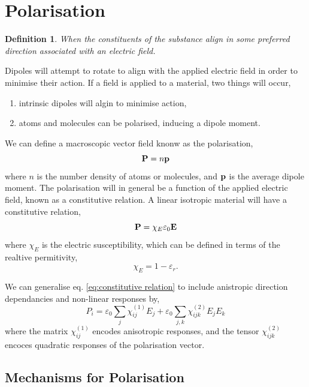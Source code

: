 \documentclass{book}
\newenvironment{aside}
{\begin{mdframed}[style=0,%
		leftline=false,rightline=false,leftmargin=2em,rightmargin=2em,%
		innerleftmargin=0pt,innerrightmargin=0pt,linewidth=0.75pt,%
		skipabove=7pt,skipbelow=7pt]\small}
	{\end{mdframed}}
\newtheorem*{definition}{Definition}
\begin{document}
\section{Polarisation}
\begin{definition}
	When the constituents of the substance align in some preferred direction associated with an electric field.
\end{definition}
Dipoles will attempt to rotate to align with the applied electric field in order to minimise their action. If a field is applied to a material, two things will occur,
\begin{enumerate}
	\item intrinsic dipoles will algin to minimise action,
	\item atoms and molecules can be polarised, inducing a dipole moment.
\end{enumerate}
We can define a macroscopic vector field knonw as the polarisation,
\begin{equation}
	\vb{P} = n\vb{p}
\end{equation}
where $n$ is the number density of atoms or molecules, and $\vb{p}$ is the average dipole moment. The polarisation will in general be a function of the applied electric field, known as a constitutive relation. A linear isotropic material will have a constitutive relation,
\begin{equation}
	\vb{P} = \chi_E\varepsilon_0\vb{E} \label{eq:constitutive relation}
\end{equation}
where $\chi_E$ is the electric susceptibility, which can be defined in terms of the realtive permitivity,
\begin{equation}
	\chi_E = 1 - \varepsilon_r.
\end{equation}
\begin{aside}
	We can generalise eq. \eqref{eq:constitutive relation} to include anistropic direction dependancies and non-linear responses by,
	\begin{equation}
		P_i = \varepsilon_0 \sum_j \chi_{ij}^{(1)}E_j + \varepsilon_0 \sum_{j,k} \chi_{ijk}^{(2)}E_jE_k
	\end{equation}
	where the matrix $\chi_{ij}^{(1)}$ encodes anisotropic responses, and the tensor $\chi_{ijk}^{(2)}$ encoces quadratic responses of the polarisation vector.
\end{aside}
\subsection{Mechanisms for Polarisation}
\end{document}
